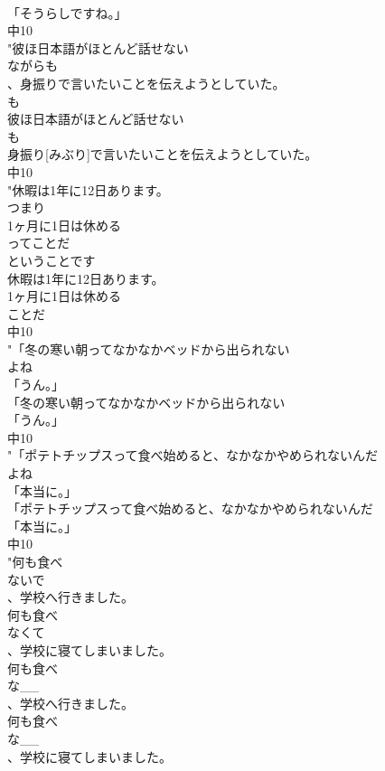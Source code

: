 \documentclass[8pt]{extreport}
\begin{document}
\begin{CJK}{UTF8}{min}
\\	「そうらしですね。」
\\	中10
\\	"彼ほ日本語がほとんど話せない
\\	ながらも
\\	、身振りで言いたいことを伝えようとしていた。
\\	も 
\\	彼ほ日本語がほとんど話せない
\\	も
\\	身振り[みぶり]で言いたいことを伝えようとしていた。
\\	中10
\\	"休暇は1年に12日あります。
\\	つまり
\\	1ヶ月に1日は休める
\\	ってことだ
\\	ということです
\\	休暇は1年に12日あります。
\\	1ヶ月に1日は休める
\\	ことだ
\\	中10
\\	"「冬の寒い朝ってなかなかベッドから出られない
\\	よね
\\	「うん。」
\\	「冬の寒い朝ってなかなかベッドから出られない
\\	「うん。」
\\	中10
\\	"「ポテトチップスって食べ始めると、なかなかやめられないんだ
\\	よね
\\	「本当に。」
\\	「ポテトチップスって食べ始めると、なかなかやめられないんだ
\\	「本当に。」
\\	中10
\\	"何も食べ
\\	ないで
\\	、学校へ行きました。
\\	何も食べ
\\	なくて
\\	、学校に寝てしまいました。
\\	何も食べ
\\	な__
\\	、学校へ行きました。
\\	何も食べ
\\	な__
\\	、学校に寝てしまいました。

\end{CJK}
\end{document}
